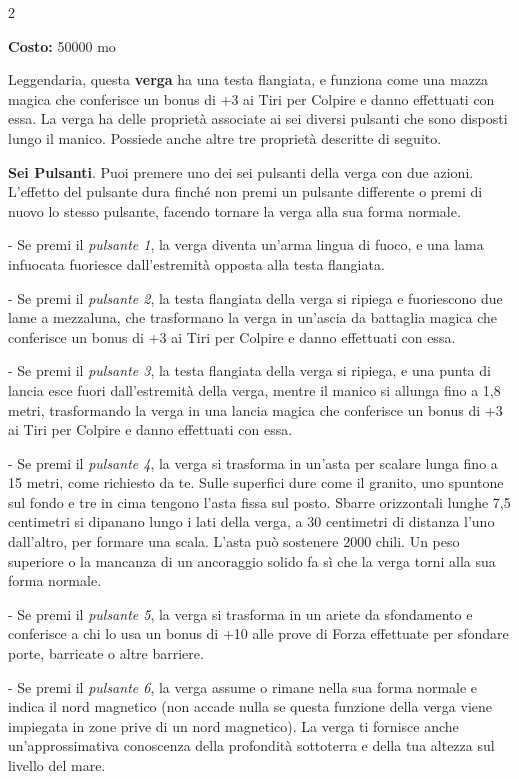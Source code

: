 \begin{multicols}{2}

\textbf{Costo:} 50000 mo

Leggendaria, questa \textbf{verga} ha una testa flangiata, e funziona come una mazza magica che conferisce un bonus di +3 ai Tiri per Colpire e danno effettuati con essa. La verga ha delle proprietà associate ai sei diversi pulsanti che sono disposti lungo il manico. Possiede anche altre tre proprietà descritte di seguito.

\textbf{Sei Pulsanti}. Puoi premere uno dei sei pulsanti della verga con due azioni. L'effetto del pulsante dura finché non premi un pulsante differente o premi di nuovo lo stesso pulsante, facendo tornare la verga alla sua forma normale.

- Se premi il \emph{pulsante 1}, la verga diventa un'arma lingua di fuoco, e una lama infuocata fuoriesce dall'estremità opposta alla testa flangiata.

- Se premi il \emph{pulsante 2}, la testa flangiata della verga si ripiega e fuoriescono due lame a mezzaluna, che trasformano la verga in un'ascia da battaglia magica che conferisce un bonus di +3 ai Tiri per Colpire e danno effettuati con essa.

- Se premi il \emph{pulsante 3}, la testa flangiata della verga si ripiega, e una punta di lancia esce fuori dall'estremità della verga, mentre il manico si allunga fino a 1,8 metri, trasformando la verga in una lancia magica che conferisce un bonus di +3 ai Tiri per Colpire e danno effettuati con essa.

- Se premi il \emph{pulsante 4}, la verga si trasforma in un'asta per scalare lunga fino a 15 metri, come richiesto da te. Sulle superfici dure come il granito, uno spuntone sul fondo e tre in cima tengono l'asta fissa sul posto. Sbarre orizzontali lunghe 7,5 centimetri si dipanano lungo i lati della verga, a 30 centimetri di distanza l'uno dall'altro, per formare una scala. L'asta può sostenere 2000 chili. Un peso superiore o la mancanza di un ancoraggio solido fa sì che la verga torni alla sua forma normale.

- Se premi il \emph{pulsante 5}, la verga si trasforma in un ariete da sfondamento e conferisce a chi lo usa un bonus di +10 alle prove di Forza effettuate per sfondare porte, barricate o altre barriere.

- Se premi il \emph{pulsante 6}, la verga assume o rimane nella sua forma normale e indica il nord magnetico (non accade nulla se questa funzione della verga viene impiegata in zone prive di un nord magnetico). La verga ti fornisce anche un'approssimativa conoscenza della profondità sottoterra e della tua altezza sul livello del mare.


\end{multicols}
